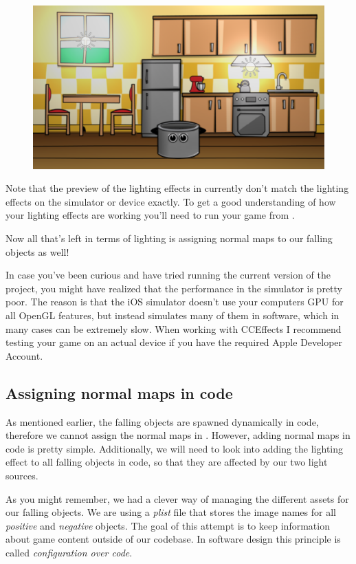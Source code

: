 \begin{figure}[H]
  \centering
  \includegraphics[width=350pt]{images/Chapter9/lighting_finished.png}
\end{figure}

Note that the preview of the lighting effects in \SB{} currently don't match the
lighting effects on the simulator or device exactly. To get a good understanding
of how your lighting effects are working you'll need to run your game from
\xcode{}.

Now all that's left in terms of lighting is assigning normal maps to
our falling objects as well!

\begin{details}
In case you've been curious and have tried running the current version of the
project, you might have realized that the performance in the simulator is
pretty poor. The reason is that the iOS simulator doesn't use your computers
GPU for all OpenGL features, but instead simulates many of them in software,
which in many cases can be extremely slow. When working with CCEffects I 
recommend testing your game on an actual device if you have the required Apple
Developer Account.
\end{details}

\subsection{Assigning normal maps in code}
As mentioned earlier, the falling objects are spawned dynamically in code,
therefore we cannot assign the normal maps in \SB{}. However, adding normal
maps in code is pretty simple. Additionally, we will need to look into
adding the lighting effect to all falling objects in code, so that they are
affected by our two light sources.

As you might remember, we had a clever way of managing the different assets for
our falling objects. We are using a \textit{plist} file that stores the image
names for all \textit{positive} and \textit{negative} objects. The goal of this
attempt is to keep information about game content outside of our codebase. In
software design this principle is called \textit{configuration over code}.


